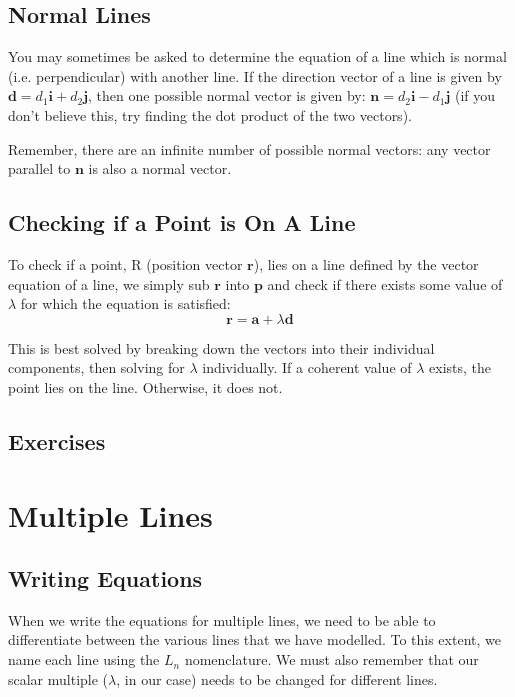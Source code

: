 \documentclass[
	11pt, %
	fleqn, %
	a4paper, %
]{../../styles/LegrandOrangeBook}
\begin{document}
\subsection{Normal Lines}

You may sometimes be asked to determine the equation of a line which is normal (i.e. perpendicular) with another line. If the direction vector of a line is given by $\mathbf{d} = d_1 \mathbf{i} + d_2 \mathbf{j}$, then one possible normal vector is given by: $\mathbf{n} = d_2 \mathbf{i} - d_1\mathbf{j}$ (if you don't believe this, try finding the dot product of the two vectors).

Remember, there are an infinite number of possible normal vectors: any vector parallel to $\mathbf{n}$ is also a normal vector.

\subsection{Checking if a Point is On A Line}

To check if a point, R (position vector $\mathbf{r}$), lies on a line defined by the vector equation of a line, we simply sub $\mathbf{r}$ into $\mathbf{p}$ and check if there exists some value of $\lambda$ for which the equation is satisfied:
\begin{equation*}
	\mathbf{r} = \mathbf{a} + \lambda \mathbf{d}
\end{equation*}

This is best solved by breaking down the vectors into their individual components, then solving for $\lambda$ individually. If a coherent value of $\lambda$ exists, the point lies on the line. Otherwise, it does not.

\subsection{Exercises}

\newpage
\section{Multiple Lines}

\subsection{Writing Equations}

When we write the equations for multiple lines, we need to be able to differentiate between the various lines that we have modelled. To this extent, we name each line using the $L_n$ nomenclature. We must also remember that our scalar multiple ($\lambda$, in our case) needs to be changed for different lines.
\end{document}

